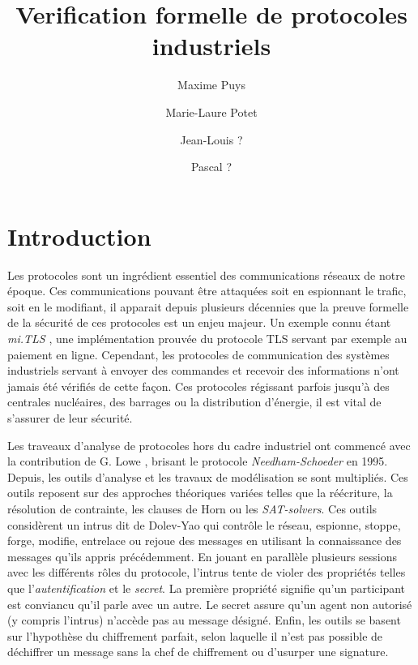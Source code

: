 \documentclass{article}
\title{Verification formelle de protocoles industriels}
\author[1]{Maxime Puys}
\author[1]{Marie-Laure Potet}
\author[2]{Jean-Louis ?}
\author[3]{Pascal ?}
\affil[1]{
    Univ. Grenoble Alpes, VERIMAG, F-38000 Grenoble, France\\
    CNRS, VERIMAG, F-38000 Grenoble, France
}
\date{}
\begin{document}
\maketitle


\section{Introduction}

Les protocoles sont un ingrédient essentiel des communications réseaux de notre époque.
Ces communications pouvant être attaquées soit en espionnant le trafic, soit en le modifiant,
il apparait depuis plusieurs décennies que la preuve formelle de la sécurité de ces protocoles
est un enjeu majeur.
Un exemple connu étant {\em mi.TLS} \cite{BFKPS13}, une implémentation prouvée du protocole TLS \cite{DR08}
servant par exemple au paiement en ligne.
Cependant, les protocoles de communication des systèmes industriels servant à envoyer des commandes
et recevoir des informations n'ont jamais été vérifiés de cette façon.
Ces protocoles régissant parfois jusqu'à des centrales nucléaires, des barrages ou la distribution d'énergie,
il est vital de s'assurer de leur sécurité.

Les traveaux d'analyse de protocoles hors du cadre industriel ont commencé avec la contribution de
G. Lowe \cite{Low96}, brisant le protocole {\em Needham-Schoeder} en 1995.
Depuis, les outils d'analyse et les travaux de modélisation se sont multipliés.
Ces outils reposent sur des approches théoriques variées telles que la réécriture,
la résolution de contrainte, les clauses de Horn ou les {\em SAT-solvers}.
Ces outils considèrent un intrus dit de Dolev-Yao \cite{DY81} qui contrôle le réseau,
espionne, stoppe, forge, modifie, entrelace ou rejoue des messages en utilisant la connaissance
des messages qu'ils appris précédemment.
En jouant en parallèle plusieurs sessions avec les différents rôles du protocole,
l'intrus tente de violer des propriétés telles que l'{\em autentification} et le {\em secret}.
La première propriété signifie qu'un participant est conviancu qu'il parle avec un autre.
Le secret assure qu'un agent non autorisé (y compris l'intrus) n'accède pas au message désigné.
Enfin, les outils se basent sur l'hypothèse du chiffrement parfait, selon laquelle
il n'est pas possible de déchiffrer un message sans la chef de chiffrement ou d'usurper une signature.
\end{document}
